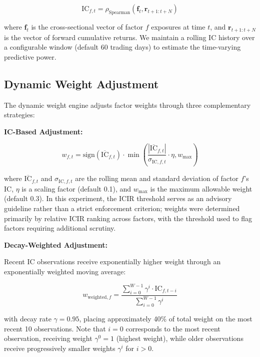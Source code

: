 \documentclass[12pt]{article}
\begin{document}
\begin{equation}
\text{IC}_{f,t} = \rho_{\text{Spearman}}\left(\mathbf{f}_t, \mathbf{r}_{t+1:t+N}\right)
\end{equation}

where $\mathbf{f}_t$ is the cross-sectional vector of factor $f$ exposures at time $t$, and $\mathbf{r}_{t+1:t+N}$ is the vector of forward cumulative returns. We maintain a rolling IC history over a configurable window (default 60 trading days) to estimate the time-varying predictive power.

\subsection{Dynamic Weight Adjustment}

The dynamic weight engine adjusts factor weights through three complementary strategies:

\textbf{IC-Based Adjustment:}

\begin{equation}
w_{f,t} = \text{sign}(\overline{\text{IC}}_{f,t}) \cdot \min\left(\frac{|\overline{\text{IC}}_{f,t}|}{\sigma_{\text{IC},f,t}} \cdot \eta, w_{\text{max}}\right)
\end{equation}

where $\overline{\text{IC}}_{f,t}$ and $\sigma_{\text{IC},f,t}$ are the rolling mean and standard deviation of factor $f$'s IC, $\eta$ is a scaling factor (default 0.1), and $w_{\text{max}}$ is the maximum allowable weight (default 0.3). In this experiment, the ICIR threshold serves as an advisory guideline rather than a strict enforcement criterion; weights were determined primarily by relative ICIR ranking across factors, with the threshold used to flag factors requiring additional scrutiny.

\textbf{Decay-Weighted Adjustment:}

Recent IC observations receive exponentially higher weight through an exponentially weighted moving average:

\begin{equation}
w_{\text{weighted},f} = \frac{\sum_{i=0}^{W-1} \gamma^{i} \cdot \text{IC}_{f,t-i}}{\sum_{i=0}^{W-1} \gamma^{i}}
\end{equation}

with decay rate $\gamma = 0.95$, placing approximately 40\% of total weight on the most recent 10 observations. Note that $i=0$ corresponds to the most recent observation, receiving weight $\gamma^{0}=1$ (highest weight), while older observations receive progressively smaller weights $\gamma^{i}$ for $i>0$.
\end{document}
